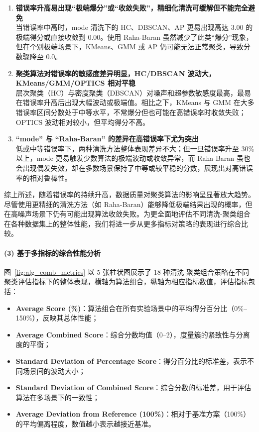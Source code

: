 \documentclass[10pt]{article} %
\numberwithin{equation}{section}
\begin{document}
\begin{enumerate}
    \item \textbf{错误率升高易出现“极端爆分”或“收敛失败”，精细化清洗可缓解但不能完全避免} \\
    当错误率中高时，mode 清洗下的 HC、DBSCAN、AP 更易出现高达 3.00 的极端得分或直接收敛到 0.00。使用 Raha-Baran 虽然减少了此类“爆分”现象，但在个别极端场景下，KMeans、GMM 或 AP 仍可能无法正常聚类，导致分数骤降至 0.0。

    \item \textbf{聚类算法对错误率的敏感度差异明显，HC/DBSCAN 波动大，KMeans/GMM/OPTICS 相对平稳} \\
    层次聚类（HC）与密度聚类（DBSCAN）对噪声和超参数敏感度最高，最易在错误率升高后出现大幅波动或极端值。相比之下，KMeans 与 GMM 在大多错误率区间分数处于中等水平，不常爆分但也可能在高错误率时收敛失败；OPTICS 波动相对较小，但平均得分不高。

    \item \textbf{“mode” 与 “Raha-Baran” 的差异在高错误率下尤为突出} \\
    低或中等错误率下，两种清洗方法整体表现差异不大；但一旦错误率升至 30\% 以上，mode 更易触发少数算法的极端波动或收敛异常，而 Raha-Baran 虽也会出现偶发失效，却在多数场景保持了中等或较平稳的分数，展现出对高错误率的相对鲁棒性。
\end{enumerate}

\noindent
综上所述，随着错误率的持续升高，数据质量对聚类算法的影响呈显著放大趋势。尽管使用更精细的清洗方法（如 Raha-Baran）能够降低极端结果出现的概率，但在高噪声场景下仍有可能出现算法收敛失败。为更全面地评估不同清洗-聚类组合在各种数据集上的整体性能，我们将进一步从更多指标对策略的表现进行综合比较。

\paragraph{(3) 基于多指标的综合性能分析}
图~\ref{fig:alg_comb_metrics} 以 5 张柱状图展示了 18 种清洗-聚类组合策略在不同聚类评估指标下的整体表现，横轴为算法组合，纵轴为相应指标数值，评估指标包括：
\begin{itemize}
    \item \textbf{Average Score (\%)}：算法组合在所有实验场景中的平均得分百分比（0\%--150\%），反映其总体性能；
    \item \textbf{Average Combined Score}：综合分数均值（0--2），度量簇的紧致性与分离度的平衡；
    \item \textbf{Standard Deviation of Percentage Score}：得分百分比的标准差，表示不同场景间的波动大小；
    \item \textbf{Standard Deviation of Combined Score}：综合分数的标准差，用于评估算法在多场景下的一致性；
    \item \textbf{Average Deviation from Reference (100\%)}：相对于基准方案（100\%）的平均偏离程度，数值越小表示越接近基准。
\end{itemize}
\end{document}
